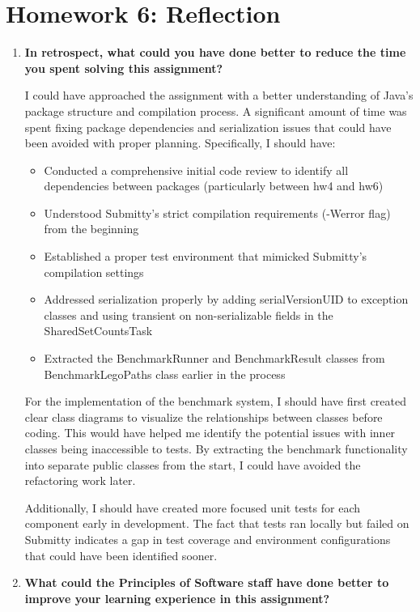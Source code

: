 \documentclass[11pt]{article}
\begin{document}
\section*{Homework 6: Reflection}

\begin{enumerate}
    \item \textbf{In retrospect, what could you have done better to reduce the time you spent solving this assignment?}
    
    I could have approached the assignment with a better understanding of Java's package structure and compilation process. A significant amount of time was spent fixing package dependencies and serialization issues that could have been avoided with proper planning. Specifically, I should have:
    
    \begin{itemize}
        \item Conducted a comprehensive initial code review to identify all dependencies between packages (particularly between hw4 and hw6)
        \item Understood Submitty's strict compilation requirements (-Werror flag) from the beginning
        \item Established a proper test environment that mimicked Submitty's compilation settings
        \item Addressed serialization properly by adding serialVersionUID to exception classes and using transient on non-serializable fields in the SharedSetCountsTask
        \item Extracted the BenchmarkRunner and BenchmarkResult classes from BenchmarkLegoPaths class earlier in the process
    \end{itemize}
    
    For the implementation of the benchmark system, I should have first created clear class diagrams to visualize the relationships between classes before coding. This would have helped me identify the potential issues with inner classes being inaccessible to tests. By extracting the benchmark functionality into separate public classes from the start, I could have avoided the refactoring work later.
    
    Additionally, I should have created more focused unit tests for each component early in development. The fact that tests ran locally but failed on Submitty indicates a gap in test coverage and environment configurations that could have been identified sooner.

    \item \textbf{What could the Principles of Software staff have done better to improve your learning experience in this assignment?}
    

\end{enumerate}
\end{document}
